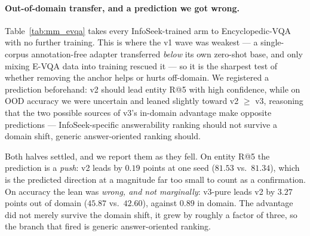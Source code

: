 %
\paragraph{Out-of-domain transfer, and a prediction we got wrong.} Table~\ref{tab:mm_evqa} takes
every InfoSeek-trained arm to Encyclopedic-VQA with no further training. This is where the v1 wave
was weakest --- a single-corpus annotation-free adapter transferred \emph{below} its own zero-shot
base, and only mixing E-VQA data into training rescued it --- so it is the sharpest test of
whether removing the anchor helps or hurts off-domain. We registered a prediction beforehand: v2
should lead entity R@5 with high confidence, while on OOD accuracy we were uncertain and leaned
slightly toward v2 $\geq$ v3, reasoning that the two possible sources of v3's in-domain advantage
make opposite predictions --- InfoSeek-specific answerability ranking should not survive a domain
shift, generic answer-oriented ranking should.

Both halves settled, and we report them as they fell. On entity R@5 the prediction is a
\emph{push}: v2 leads by $0.19$ points at one seed ($81.53$ vs.\ $81.34$), which is the predicted
direction at a magnitude far too small to count as a confirmation. On accuracy the lean was
\emph{wrong, and not marginally}: v3-pure leads v2 by $3.27$ points out of domain
($45.87$ vs.\ $42.60$), against $0.89$ in domain. The advantage did not merely survive the domain
shift, it grew by roughly a factor of three, so the branch that fired is generic answer-oriented
ranking.

